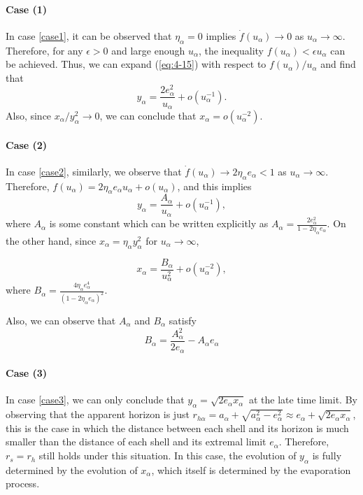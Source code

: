 \documentclass[letterpaper,12pt]{article}
\begin{document}
\paragraph{Case (1)}
In case \ref{case1}, it can be observed that $\eta_{\alpha} = 0$ implies $\dot{f}(u_{\alpha}) \rightarrow 0$ as $u_{\alpha} \rightarrow \infty$. Therefore, for any $\epsilon > 0$ and large enough $u_{\alpha}$, the inequality $f(u_{\alpha}) < \epsilon u_{\alpha}$ can be achieved. Thus, we can expand (\ref{eq:4-15}) with respect to $f(u_{\alpha})/ u_{\alpha}$ and find that
\begin{equation}\label{eq:4-23}
y_{\alpha} = \frac{2e_{\alpha}^{2}}{u_{\alpha}}+o(u_{
\alpha}^{-1}).
\end{equation}
Also, since $x_{\alpha}/y_{\alpha}^{2} \rightarrow 0$, we can conclude that $x_{\alpha} = o(u_{\alpha}^{-2})$. 
\paragraph{Case (2)}
In case \ref{case2}, similarly, we observe that $\dot{f}(u_{\alpha}) \rightarrow 2\eta_{\alpha} e_{\alpha} < 1$ as $u_{\alpha} \rightarrow \infty$. Therefore, $f(u_{\alpha}) = 2\eta_{\alpha} e_{\alpha} u_{\alpha} + o (u_{\alpha})$, and this implies 
\begin{equation}\label{eq:4-24}
y_{\alpha} = \frac{A_{\alpha}}{u_{\alpha}}+ o(u_{\alpha}^{-1}),
\end{equation}
 where $A_{\alpha}$ is some constant which can be written explicitly as $A_{\alpha} = \frac{2e_{\alpha}^{2}}{1- 2\eta_{\alpha} e_{\alpha}}$. On the other hand, since $x_{\alpha} = \eta_{\alpha} y_{\alpha}^{2}$ for $u_{\alpha} \rightarrow \infty$,
 
\begin{equation}\label{eq:4-25}
 x_{\alpha} = \frac{B_{\alpha}}{u_{\alpha}^{2}}+ o(u_{\alpha}^{-2}),
\end{equation}
where $B_{\alpha} = \frac{4\eta_{\alpha} e_{\alpha}^{4}}{(1-2\eta_{\alpha} e_{\alpha})^{2}}$.

Also, we can observe that $A_{\alpha}$ and $B_{\alpha}$ satisfy  
\begin{equation}
B_{\alpha} = \frac{A_{\alpha}^{2}}{2e_{\alpha}}-A_{\alpha}e_{\alpha} 
\end{equation}

\paragraph{Case (3)}
In case \ref{case3}, we can only conclude that $y_{\alpha} = \sqrt{2e_{\alpha}x_{\alpha}}$ at the late time limit. By observing that the apparent horizon is just $r_{h\alpha} = a_{\alpha}+\sqrt{a_{\alpha}^{2}-e_{\alpha}^{2}} \approx e_{\alpha}+\sqrt{2e_{\alpha}x_{\alpha}}$, this is the case in which the distance between each shell and its horizon is much smaller than the distance of each shell and its extremal limit $e_{\alpha}$. Therefore, $r_{s} = r_{h}$ still holds under this situation. In this case, the evolution of $y_{\alpha}$ is fully determined by the evolution of $x_{\alpha}$, which itself is determined by the evaporation process.
\end{document}
